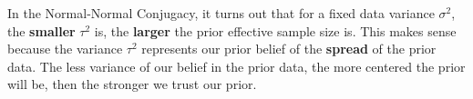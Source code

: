 \documentclass{article}
\begin{document}
In the Normal-Normal Conjugacy, it turns out that for a fixed data variance $\sigma^2$, the \textbf{smaller} $\tau^2$ is, the \textbf{larger} the prior effective sample size is. This makes sense because the variance $\tau^2$ represents our prior belief of the \textbf{spread} of the prior data. The less variance of our belief in the prior data, the more centered the prior will be, then the stronger we trust our prior.
\end{document}
